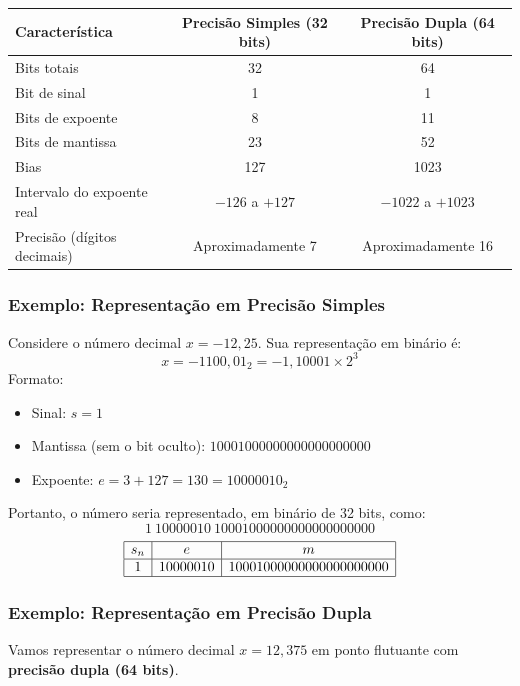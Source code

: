 \begin{center}
\begin{tabular}{|l|c|c|}
\hline
\textbf{Característica} & \textbf{Precisão Simples (32 bits)} & \textbf{Precisão Dupla (64 bits)} \\
\hline
Bits totais & 32 & 64 \\
\hline
Bit de sinal & 1 & 1 \\
\hline
Bits de expoente & 8 & 11 \\
\hline
Bits de mantissa & 23 & 52 \\
\hline
Bias & 127 & 1023 \\
\hline
Intervalo do expoente real & \(-126\) a \(+127\) & \(-1022\) a \(+1023\) \\
\hline
Precisão (dígitos decimais) & Aproximadamente 7 & Aproximadamente 16 \\
\hline
\end{tabular}
\end{center}

\subsubsection*{Exemplo: Representação em \textbf{Precisão Simples}}

Considere o número decimal \( x = -12{,}25 \). Sua representação em binário é:
\[
x = -1100{,}01_2 = -1{,}10001 \times 2^3
\]
Formato:

\begin{itemize}
  \item Sinal: \( s = 1 \)
  \item Mantissa (sem o bit oculto): \( 10001000000000000000000 \)
  \item Expoente: \( e = 3 + 127 = 130 = 10000010_2 \)
\end{itemize}

Portanto, o número seria representado, em binário de 32 bits, como:
\[
\boxed{1\ 10000010\ 10001000000000000000000}
\]
\[
\begin{array}{|c|c|c|} \hline
s_n & e        & m \\ \hline
1   & 10000010 & 10001000000000000000000 \\ \hline
\end{array}
\]
\subsubsection*{Exemplo: Representação em Precisão Dupla}

Vamos representar o número decimal \( x = 12{,}375 \) em ponto flutuante com \textbf{precisão dupla (64 bits)}.

